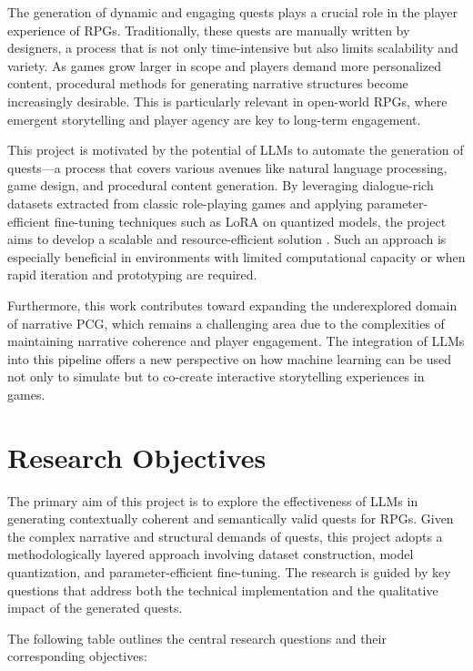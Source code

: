 The generation of dynamic and engaging quests plays a crucial role in the player experience
of RPGs. Traditionally, these quests are manually written by designers, a process
that is not only time-intensive but also limits scalability and variety. As games grow larger
in scope and players demand more personalized content, procedural methods for generating
narrative structures become increasingly desirable. This is particularly relevant in
open-world RPGs, where emergent storytelling and player agency are key to long-term
engagement.

This project is motivated by the potential of LLMs to automate
the generation of quests—a process that covers various avenues like natural language processing, game
design, and procedural content generation. By leveraging dialogue-rich datasets extracted
from classic role-playing games and applying parameter-efficient fine-tuning techniques
such as LoRA on quantized models, the project aims to develop a scalable and resource-efficient
solution \cite{hu2022lora,dettmers2023qlora}. Such an approach is especially beneficial in environments with
limited computational capacity or when rapid iteration and prototyping are required.

Furthermore, this work contributes toward expanding the underexplored domain of
narrative PCG, which remains a challenging area due to the complexities of maintaining
narrative coherence and player engagement. The integration of LLMs into this pipeline
offers a new perspective on how machine learning can be used not only to simulate but
to co-create interactive storytelling experiences in games.

\section{Research Objectives}

The primary aim of this project is to explore the effectiveness of LLMs in generating contextually
coherent and semantically valid quests for RPGs. Given the complex narrative
and structural demands of quests, this project adopts a methodologically layered approach
involving dataset construction, model quantization, and parameter-efficient fine-tuning.
The research is guided by key questions that address both the technical implementation
and the qualitative impact of the generated quests.

The following table outlines the central research questions and their corresponding
objectives:

